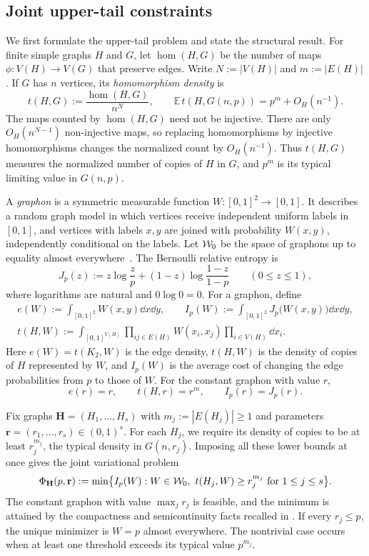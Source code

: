 \subsection{Joint upper-tail constraints}\label{sec:main-results}

We first formulate the upper-tail problem and state the structural result.
For finite simple graphs $H$ and $G$, let $\hom(H,G)$ be the number of
maps $\phi:V(H)\to V(G)$ that preserve edges. Write $N:=|V(H)|$ and
$m:=|E(H)|$. If $G$ has $n$ vertices, its \emph{homomorphism density} is
\[
  t(H,G):=\frac{\hom(H,G)}{n^N},
  \qquad \mathbb E\,t(H,G(n,p))=p^m+O_H(n^{-1}).
\]
The maps counted by $\hom(H,G)$ need not be injective. There are only
$O_H(n^{N-1})$ non-injective maps, so replacing homomorphisms by injective
homomorphisms changes the normalized count by $O_H(n^{-1})$.
Thus $t(H,G)$ measures the normalized number of copies of $H$ in $G$,
and $p^m$ is its typical limiting value in $G(n,p)$.

A \emph{graphon} is a symmetric measurable function
$W:[0,1]^2\to[0,1]$. It describes a random graph model in which vertices
receive independent uniform labels in $[0,1]$, and vertices with labels
$x,y$ are joined with probability $W(x,y)$, independently conditional on
the labels. Let $\mathcal W_0$ be the space of graphons up to equality almost
everywhere~\cite{LovaszGraphLimits}. The Bernoulli relative entropy is
\[
  J_p(z):=z\log\frac zp+(1-z)\log\frac{1-z}{1-p}
  \qquad(0\le z\le1),
\]
where logarithms are natural and $0\log0=0$. For a graphon, define
\begin{equation}\label{eq:graphon-quantities}
  \begin{gathered}
    e(W):=\int_{[0,1]^2}W(x,y)\dd x\dd y,\qquad
    I_p(W):=\int_{[0,1]^2}J_p\bigl(W(x,y)\bigr)\dd x\dd y,\\
    t(H,W):=\int_{[0,1]^{V(H)}}\prod_{ij\in E(H)}W(x_i,x_j)
      \prod_{i\in V(H)}\dd x_i.
  \end{gathered}
\end{equation}
Here $e(W)=t(K_2,W)$ is the edge density, $t(H,W)$ is the density of
copies of $H$ represented by $W$, and $I_p(W)$ is the average cost of
changing the edge probabilities from $p$ to those of $W$.
For the constant graphon with value $r$,
\[
  e(r)=r,\qquad t(H,r)=r^m,\qquad I_p(r)=J_p(r).
\]

Fix graphs $\mathbf H=(H_1,\dots,H_s)$ with $m_j:=|E(H_j)|\ge1$ and
parameters $\mathbf r=(r_1,\dots,r_s)\in(0,1)^s$. For each $H_j$, we
require its density of copies to be at least $r_j^{m_j}$, the typical
density in $G(n,r_j)$. Imposing all these lower bounds at once gives the
joint variational problem
\begin{equation}\label{eq:joint-variational-problem}
  \Phi_{\mathbf H}(p,\mathbf r):=
  \min\bigl\{I_p(W):W\in\mathcal W_0,\ t(H_j,W)\ge r_j^{m_j}
                                  \text{ for }1\le j\le s\bigr\}.
\end{equation}
The constant graphon with value $\max_j r_j$ is feasible, and the
minimum is attained by the compactness and semicontinuity facts recalled
in . If every $r_j\le p$, the unique minimizer
is $W=p$ almost everywhere. The nontrivial case occurs when at least one
threshold exceeds its typical value $p^{m_j}$.

